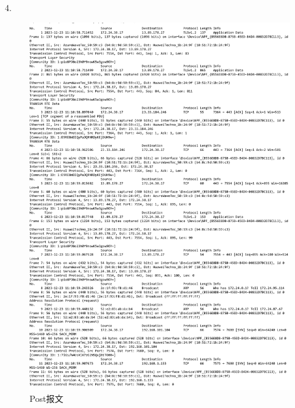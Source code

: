 \documentclass{article}
\newcommand{\tu}[2][width=\textwidth]{%
  \begin{figure}[htbp]
    \centering
    \texttt{[image: \#2]}
  \end{figure}
}
\begin{document}
4.
\newpage
\begin{figure}[htbp]
    \centering
    \includegraphics[width=1\textwidth]{lab0.2.pdf} %
    \caption{Post报文}
\end{figure}
\newpage
\end{document}

